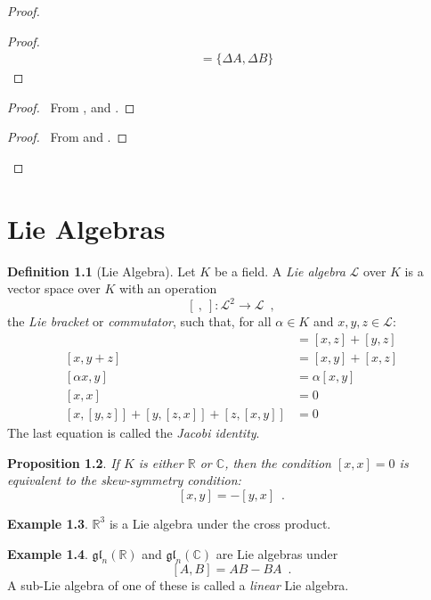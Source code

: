 \documentclass{book}
\let\qed\relax
\newtheorem{prop}{Proposition}[chapter]
\theoremstyle{definition}
\newtheorem{df}[prop]{Definition}
\newtheorem{ex}[prop]{Example}
\newcommand{\gl}[2]{\ensuremath{\mathfrak{gl}_{#1} \left( {#2} \right)}}
\begin{document}
\begin{proof}
\begin{proof}
\begin{align*}
		& = \{ \Delta A, \Delta B \}
	\end{align*}
\end{proof}
\begin{proof}
	\pf\ From ,  and .
\end{proof}
\begin{proof}
	\pf\ From  and .
\end{proof}
\qed
\end{proof}

\chapter{Lie Algebras}

\begin{df}[Lie Algebra]
Let $K$ be a field. A \emph{Lie algebra} $\mathcal{L}$ over $K$ is a vector space over $K$ with an operation
\[ [\ ,\ ] : \mathcal{L}^2 \rightarrow \mathcal{L} \enspace , \]
the \emph{Lie bracket} or \emph{commutator}, such that, for all $\alpha \in K$ and $x,y,z \in \mathcal{L}$:
\begin{align*}
[x+y,z] & = [x,z] + [y,z] \\
[x,y+z] & = [x,y] + [x,z] \\
[\alpha x,y] & = \alpha [x,y] \\
[x,x] & = 0 \\
[x,[y,z]] + [y,[z,x]] + [z,[x,y]] & = 0
\end{align*}
The last equation is called the \emph{Jacobi identity}.
\end{df}

\begin{prop}
If $K$ is either $\mathbb{R}$ or $\mathbb{C}$, then the condition $[x,x] = 0$ is equivalent to the \emph{skew-symmetry condition}:
\[ [x,y] = -[y,x] \enspace . \]
\end{prop}


\begin{ex}
$\mathbb{R}^3$ is a Lie algebra under the cross product.
\end{ex}

\begin{ex}
$\gl
{n}{\mathbb{R}}$ and $\gl{n}{\mathbb{C}}$ are Lie algebras under
\[ [A,B] = AB - BA \enspace . \]
A sub-Lie algebra of one of these is called a \emph{linear} Lie algebra.
\end{ex}
\end{document}
